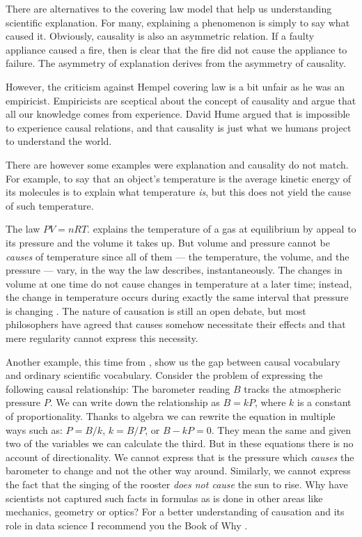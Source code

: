 \documentclass[
]{book}
\begin{document}
There are alternatives to the covering law model that help us understanding scientific explanation. For many, explaining a phenomenon is simply to say what caused it. Obviously, causality is also an asymmetric relation. If a faulty appliance caused a fire, then is clear that the fire did not cause the appliance to failure. The asymmetry of explanation derives from the asymmetry of causality.

However, the criticism against Hempel covering law is a bit unfair as he was an empiricist. Empiricists are sceptical about the concept of causality and argue that all our knowledge comes from experience. David Hume argued that is impossible to experience causal relations, and that causality is just what we humans project to understand the world.

There are however some examples were explanation and causality do not match. For example, to say that an object's temperature is the average kinetic energy of its molecules is to explain what temperature \emph{is}, but this does not yield the cause of such temperature.

The law \(PV = nRT.\) explains the temperature of a gas at equilibrium by appeal to its pressure and the volume it takes up. But volume and pressure cannot be \emph{causes} of temperature since all of them --- the temperature, the volume, and the pressure --- vary, in the way the law describes, instantaneously. The changes in volume at one time do not cause changes in temperature at a later time; instead, the change in temperature occurs during exactly the same interval that pressure is changing \citep{rosenberg2019philosophy}. The nature of causation is still an open debate, but most philosophers have agreed that causes somehow necessitate their effects and that mere regularity cannot express this necessity.

Another example, this time from \citep{book-of-why}, show us the gap between causal vocabulary and ordinary scientific vocabulary. Consider the problem of expressing the following causal relationship: The barometer reading \(B\) tracks the atmospheric pressure \(P\). We can write down the relationship as \(B = kP\), where \(k\) is a constant of proportionality. Thanks to algebra we can rewrite the equation in multiple ways such as: \(P = B/k\), \(k = B/P\), or \(B-kP = 0\). They mean the same and given two of the variables we can calculate the third. But in these equations there is no account of directionality. We cannot express that is the pressure which \emph{causes} the barometer to change and not the other way around. Similarly, we cannot express the fact that the singing of the rooster \emph{does not cause} the sun to rise. Why have scientists not captured such facts in formulas as is done in other areas like mechanics, geometry or optics? For a better understanding of causation and its role in data science I recommend you the Book of Why \citep{book-of-why}.
\end{document}
